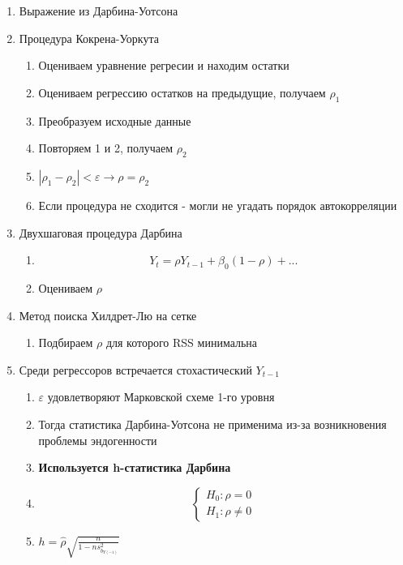 \documentclass[a4paper, 12pt]{article}
\begin{document}
\begin{enumerate}
    \item Выражение из Дарбина-Уотсона
    \item Процедура Кокрена-Уоркута
    \begin{enumerate}
        \item Оцениваем уравнение регресии и находим остатки
        \item Оцениваем регрессию остатков на предыдущие, получаем $\rho_{1}$
        \item Преобразуем исходные данные
        \item Повторяем 1 и 2, получаем $\rho_{2}$ 
        \item $|\rho_{1} - \rho_{2}| < \varepsilon \rightarrow \rho = \rho_{2}$
        \item Если процедура не сходится - могли не угадать порядок автокорреляции
    \end{enumerate}
    \item Двухшаговая процедура Дарбина
    \begin{enumerate}
        \item \[Y_{t} = \rho Y_{t - 1} + \beta_{0}(1 - \rho) + ...\]
        \item Оцениваем $\rho$
    \end{enumerate}
    \item Метод поиска Хилдрет-Лю на сетке
    \begin{enumerate}
        \item Подбираем $\rho$ для которого RSS минимальна
    \end{enumerate}
    \item Среди регрессоров встречается стохастический $Y_{t - 1}$
    \begin{enumerate}
        \item $\varepsilon$ удовлетворяют Марковской схеме 1-го уровня
        \item Тогда статистика Дарбина-Уотсона не применима из-за возникновения проблемы эндогенности
        \item \textbf{Используется h-статистика Дарбина}
        \item \[\begin{cases}
            H_0: \rho = 0 \\
            H_1: \rho \neq 0
        \end{cases}\]
        \item \(h = \hat \rho \sqrt{\frac{n}{1 - ns^{2}_{b_{Y(-1)}}}}\)
    \end{enumerate}

\end{enumerate}
\end{document}
